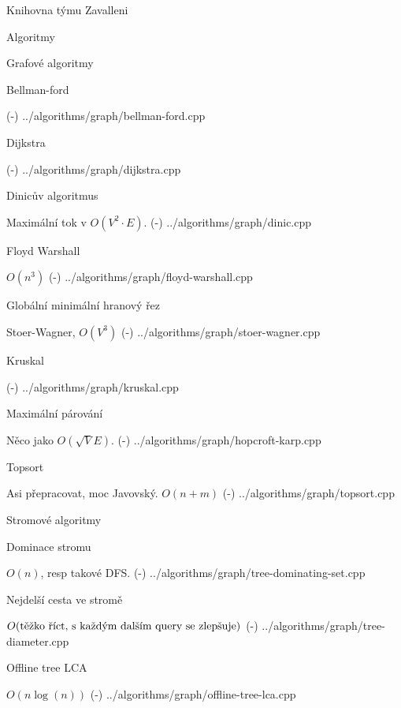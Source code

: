 
\chyph

\hyperlinks{\Blue}{\Green} %

\def\newpage{\vfil \break} %
\def\linebreak{\hfil \break} %
\overfullrule=0pt %
\def\tthook{\ttline=-2} %

\tit Knihovna týmu Zavalleni

\maketoc

\chap Algoritmy

\sec Grafové algoritmy 

\secc Bellman-ford 

\verbinput (-) ../algorithms/graph/bellman-ford.cpp

\secc Dijkstra 

\verbinput (-) ../algorithms/graph/dijkstra.cpp

\secc Dinicův algoritmus 

Maximální tok v $O(V^2 \cdot E)$.
\verbinput (-) ../algorithms/graph/dinic.cpp

\secc Floyd Warshall 

$O(n^3)$
\verbinput (-) ../algorithms/graph/floyd-warshall.cpp

\secc Globální minimální hranový řez 

Stoer-Wagner, $O(V^3)$
\verbinput (-) ../algorithms/graph/stoer-wagner.cpp

\secc Kruskal 

\verbinput (-) ../algorithms/graph/kruskal.cpp

\secc Maximální párování 

Něco jako $O(\sqrt{V}E)$.
\verbinput (-) ../algorithms/graph/hopcroft-karp.cpp

\secc Topsort 

Asi přepracovat, moc Javovský. $O(n + m)$
\verbinput (-) ../algorithms/graph/topsort.cpp

\sec Stromové algoritmy 

\secc Dominace stromu 

$O(n)$, resp takové DFS.
\verbinput (-) ../algorithms/graph/tree-dominating-set.cpp

\secc Nejdelší cesta ve stromě 

$O(\hbox{těžko říct, s každým dalším query se zlepšuje})$
\verbinput (-) ../algorithms/graph/tree-diameter.cpp

\secc Offline tree LCA 

$O(n\log(n))$
\verbinput (-) ../algorithms/graph/offline-tree-lca.cpp

